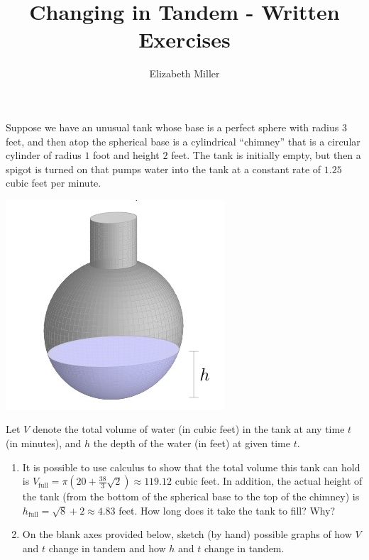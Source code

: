 \documentclass[handout]{ximera}
\author{Elizabeth Miller}
\title{Changing in Tandem - Written Exercises}
\begin{document}
\begin{abstract}
\end{abstract}
\maketitle




\begin{problem}
Suppose we have an unusual tank whose base is a perfect sphere with radius \(3\) feet, and then atop the spherical base is a cylindrical ``chimney'' that is a circular cylinder of radius \(1\) foot and height \(2\) feet.  The tank is initially empty, but then a spigot is turned on that pumps water into the tank at a constant rate of \(1.25\) cubic feet per minute.%

\includegraphics{CiT-WH1.jpg}

Let \(V\) denote the total volume of water (in cubic feet) in the tank at any time \(t\) (in minutes), and \(h\) the depth of the water (in feet) at given time \(t\).%

\begin{enumerate}[label=\alph*.]
\item It is possible to use calculus to show that the total volume this tank can hold is \(V_{\text{full}} = \pi(20 + \frac{38}{3}\sqrt{2}) \approx 119.12\) cubic feet.  In addition, the actual height of the tank (from the bottom of the spherical base to the top of the chimney) is \(h_{\text{full}} = \sqrt{8} + 2 \approx 4.83\) feet.  How long does it take the tank to fill?   Why?%
\item On the blank axes provided below, sketch (by hand) possible graphs of how \(V\) and \(t\) change in tandem and how \(h\) and \(t\) change in tandem.%


\end{enumerate}
\end{problem}
\end{document}
